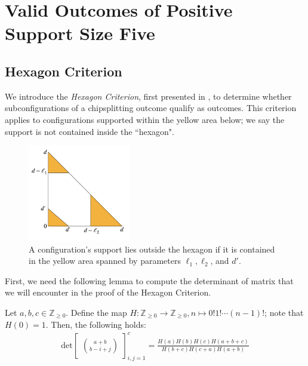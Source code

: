 \chapter{Valid Outcomes of Positive Support Size Five}

\section{Hexagon Criterion}

We introduce the \emph{Hexagon Criterion}, first presented in \cite{bik2022classifying}, to determine whether subconfigurations of a chipsplitting outcome qualify as outcomes. This criterion applies to configurations supported within the yellow area below; we say the support is not contained inside the ``hexagon".

\begin{figure}[H]
    \centering
    \includegraphics[width=0.4\textwidth]{assets/hexagon.png}
    \caption{A configuration's support lies outside the hexagon if it is contained in the yellow area spanned by parameters \( \ell_1, \ell_2 \), and \( d' \).}     \label{fig:hexagon}
\end{figure}

First, we need the following lemma to compute the determinant of matrix that we will encounter in the proof of the Hexagon Criterion.

\begin{lemma}\label{lemma:grinberghyperfactorial}
    Let \( a,b,c \in \mathbb{Z}_{\geq 0} \). Define the map \( H:  \mathbb{Z}_{\geq 0} \to  \mathbb{Z}_{\geq 0}, n \mapsto 0! 1! \cdots (n-1)! \); note that \( H(0) = 1 \). Then, the following holds:
    \begin{align*}
        \mathrm{det}\begin{bmatrix}
            \binom{a+b}{b-i+j}
        \end{bmatrix}_{i,j = 1}^c = \frac{H(a)H(b)H(c)H(a+b+c)}{H(b+c)H(c+a)H(a+b)}
    \end{align*} 
\end{lemma}

